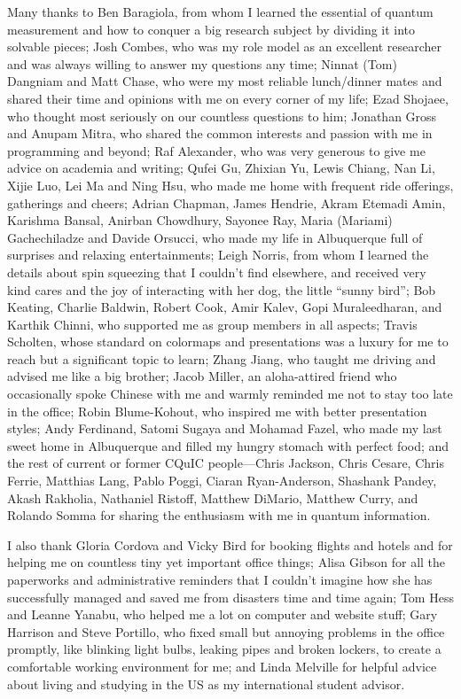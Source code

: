 \begin{acknowledgments}
Many thanks to Ben Baragiola, from whom I learned the essential of quantum measurement and how to conquer a big research subject by dividing it into solvable pieces; 
Josh Combes, who was my role model as an excellent researcher and was always willing to answer my questions any time; 
Ninnat (Tom) Dangniam and Matt Chase, who were my most reliable lunch/dinner mates and shared their time and opinions with me on every corner of my life; 
Ezad Shojaee, who thought most seriously on our countless questions to him; 
Jonathan Gross and Anupam Mitra, who shared the common interests and passion with me in programming and beyond; 
Raf Alexander, who was very generous to give me advice on academia and writing; 
Qufei Gu, Zhixian Yu, Lewis Chiang, Nan Li, Xijie Luo, Lei Ma and Ning Hsu, who made me home with frequent ride offerings, gatherings and cheers; 
Adrian Chapman, James Hendrie, Akram Etemadi Amin, Karishma Bansal, Anirban Chowdhury, Sayonee Ray, Maria (Mariami) Gachechiladze and Davide Orsucci, who made my life in Albuquerque full of surprises and relaxing entertainments; 
Leigh Norris, from whom I learned the details about spin squeezing that I couldn't find elsewhere, and received very kind cares and the joy of interacting with her dog, the little ``sunny bird''; 
Bob Keating, Charlie Baldwin, Robert Cook, Amir Kalev, Gopi Muraleedharan, and Karthik Chinni, who supported me as group members in all aspects; 
Travis Scholten, whose standard on colormaps and presentations was a luxury for me to reach but a significant topic to learn; 
Zhang Jiang, who taught me driving and advised me like a big brother; 
Jacob Miller, an aloha-attired friend who occasionally spoke Chinese with me and warmly reminded me not to stay too late in the office; 
Robin Blume-Kohout, who inspired me with better presentation styles; 
Andy Ferdinand, Satomi Sugaya and Mohamad Fazel, who made my last sweet home in Albuquerque and filled my hungry stomach with perfect food; 
and the rest of current or former CQuIC people---Chris Jackson, Chris Cesare, Chris Ferrie, Matthias Lang, Pablo Poggi, Ciaran Ryan-Anderson, Shashank Pandey, Akash Rakholia, Nathaniel Ristoff, Matthew DiMario, Matthew Curry, and Rolando Somma for sharing the enthusiasm with me in quantum information.

I also thank Gloria Cordova and Vicky Bird for booking flights and hotels and for helping me on countless tiny yet important office things; 
Alisa Gibson for all the paperworks and administrative reminders that I couldn't imagine how she has successfully managed and saved me from disasters time and time again; 
Tom Hess and Leanne Yanabu, who helped me a lot on computer and website stuff; 
Gary Harrison and Steve Portillo, who fixed small but annoying problems in the office promptly, like blinking light bulbs, leaking pipes and broken lockers, to create a comfortable working environment for me; 
and Linda Melville for helpful advice about living and studying in the \hbox{US} as my international student advisor.


\end{acknowledgments}
